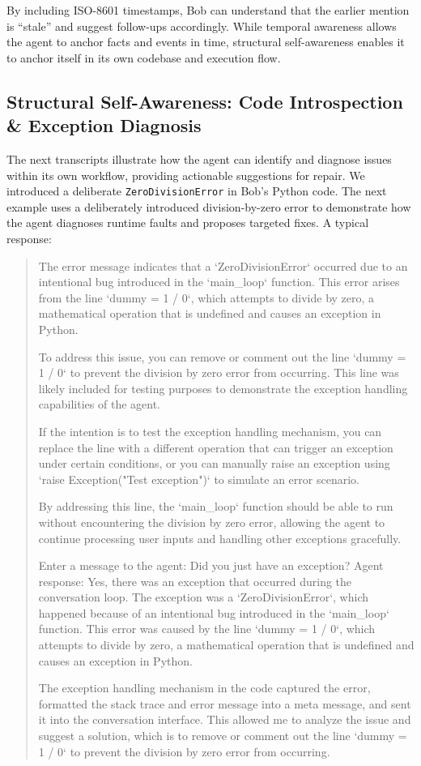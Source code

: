 \documentclass[conference]{IEEEtran}
\begin{document}
By including ISO-8601 timestamps, Bob can understand that the earlier mention 
is ``stale'' and suggest follow-ups accordingly.
While temporal awareness allows the agent to anchor facts and events in time, structural self-awareness
enables it to anchor itself in its own codebase and execution flow.

\subsection{Structural Self-Awareness: Code Introspection \& Exception Diagnosis}


The next transcripts illustrate how the agent can identify 
and diagnose issues within its own workflow, providing actionable suggestions for repair.
We introduced a deliberate \texttt{ZeroDivisionError} in Bob's Python code.
The next example uses a deliberately introduced 
division-by-zero error to demonstrate how the agent 
diagnoses runtime faults and proposes targeted fixes.
A typical response:
\begin{quote}

  The error 
  message indicates that a `ZeroDivisionError` occurred 
  due to an intentional bug introduced in the `main\_loop` 
  function. This error arises from the line `dummy = 1 / 0`, 
  which attempts to divide by zero, a mathematical operation 
  that is undefined and causes an exception in Python.
  
  To address this issue, you can remove or comment out the line 
  `dummy = 1 / 0` to prevent the division by zero error 
  from occurring. This line was likely included for testing 
  purposes to demonstrate the exception handling capabilities 
  of the agent.
  
  If the intention is to test the exception handling mechanism, 
  you can replace the line with a different operation that 
  can trigger an exception under certain conditions, or 
  you can manually raise an exception using 
  `raise Exception("Test exception")` to simulate an error scenario.
  
  By addressing this line, the `main\_loop` function should 
  be able to run without encountering the division by zero error, 
  allowing the agent to continue processing user inputs and 
  handling other exceptions gracefully.

  Enter a message to the agent: Did you just have an exception?
  Agent response: Yes, there was an exception that occurred 
  during the conversation loop. The exception was a `ZeroDivisionError`, 
  which happened because of an intentional bug introduced in the 
  `main\_loop` function. This error was caused by the line `dummy = 1 / 0`,
   which attempts to divide by zero, a mathematical operation 
   that is undefined and causes an exception in Python.
  
  The exception handling mechanism in the code captured the error, 
  formatted the stack trace and error message into a meta message, 
  and sent it into the conversation interface. This allowed me 
  to analyze the issue and suggest a solution, which is to remove 
  or comment out the line `dummy = 1 / 0` to prevent 
  the division by zero error from occurring.
  
\end{quote}
\end{document}
